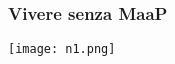 \begin{frame}
  \frametitle{Vivere senza MaaP}
  \centering
  \texttt{[image: n1.png]}
\end{frame}


